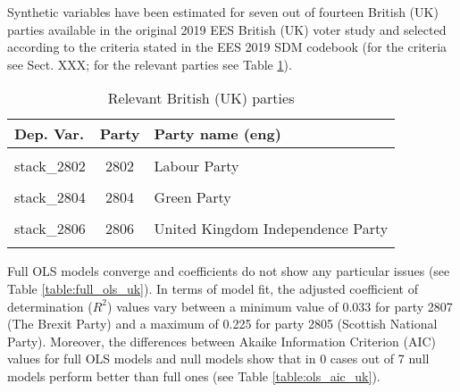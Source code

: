 \documentclass[
]{article}
\begin{document}
Synthetic variables have been estimated for seven out of fourteen British (UK) parties available in the original
2019 EES British (UK) voter study and selected according to the criteria stated in the EES 2019 SDM codebook (for the criteria see Sect. XXX; for the relevant parties see Table \ref{table:relprty_tab_uk}).

\begin{table}[!h]

\caption{\label{tab:unnamed-chunk-180}Relevant British (UK) parties \label{table:relprty_tab_uk}}
\centering
\begin{tabular}[t]{lcl}
\toprule
Dep. Var. & Party & Party name (eng)\\
\midrule
\cellcolor{gray!6}{stack\_2801} & \cellcolor{gray!6}{2801} & \cellcolor{gray!6}{Conservative Party}\\
stack\_2802 & 2802 & Labour Party\\
\cellcolor{gray!6}{stack\_2803} & \cellcolor{gray!6}{2803} & \cellcolor{gray!6}{Liberal Democrats}\\
stack\_2804 & 2804 & Green Party\\
\cellcolor{gray!6}{stack\_2805} & \cellcolor{gray!6}{2805} & \cellcolor{gray!6}{Scottish National Party}\\
\addlinespace
stack\_2806 & 2806 & United Kingdom Independence Party\\
\cellcolor{gray!6}{stack\_2807} & \cellcolor{gray!6}{2807} & \cellcolor{gray!6}{The Brexit Party}\\
\bottomrule
\end{tabular}
\end{table}

Full OLS models converge and coefficients do not show any particular issues (see Table
\ref{table:full_ols_uk}).
In terms of model fit, the adjusted coefficient of determination (\(R^2\)) values vary between
a minimum value of 0.033
for party 2807
(The Brexit Party)
and a maximum of 0.225
for party 2805
(Scottish National Party).
Moreover, the differences between Akaike Information Criterion (AIC) values for full OLS models and null
models show that in 0 cases out of 7 null models perform better than full ones (see Table
\ref{table:ols_aic_uk}).
\end{document}
